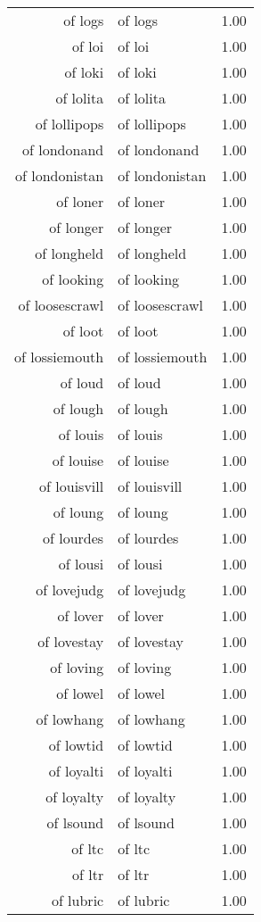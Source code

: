 \begin{table}[ht]
\begin{tabular}{rlr}
  of logs & of logs & 1.00 \\ 
  of loi & of loi & 1.00 \\ 
  of loki & of loki & 1.00 \\ 
  of lolita & of lolita & 1.00 \\ 
  of lollipops & of lollipops & 1.00 \\ 
  of londonand & of londonand & 1.00 \\ 
  of londonistan & of londonistan & 1.00 \\ 
  of loner & of loner & 1.00 \\ 
  of longer & of longer & 1.00 \\ 
  of longheld & of longheld & 1.00 \\ 
  of looking & of looking & 1.00 \\ 
  of loosescrawl & of loosescrawl & 1.00 \\ 
  of loot & of loot & 1.00 \\ 
  of lossiemouth & of lossiemouth & 1.00 \\ 
  of loud & of loud & 1.00 \\ 
  of lough & of lough & 1.00 \\ 
  of louis & of louis & 1.00 \\ 
  of louise & of louise & 1.00 \\ 
  of louisvill & of louisvill & 1.00 \\ 
  of loung & of loung & 1.00 \\ 
  of lourdes & of lourdes & 1.00 \\ 
  of lousi & of lousi & 1.00 \\ 
  of lovejudg & of lovejudg & 1.00 \\ 
  of lover & of lover & 1.00 \\ 
  of lovestay & of lovestay & 1.00 \\ 
  of loving & of loving & 1.00 \\ 
  of lowel & of lowel & 1.00 \\ 
  of lowhang & of lowhang & 1.00 \\ 
  of lowtid & of lowtid & 1.00 \\ 
  of loyalti & of loyalti & 1.00 \\ 
  of loyalty & of loyalty & 1.00 \\ 
  of lsound & of lsound & 1.00 \\ 
  of ltc & of ltc & 1.00 \\ 
  of ltr & of ltr & 1.00 \\ 
  of lubric & of lubric & 1.00 \\ 

\end{tabular}
\end{table}
